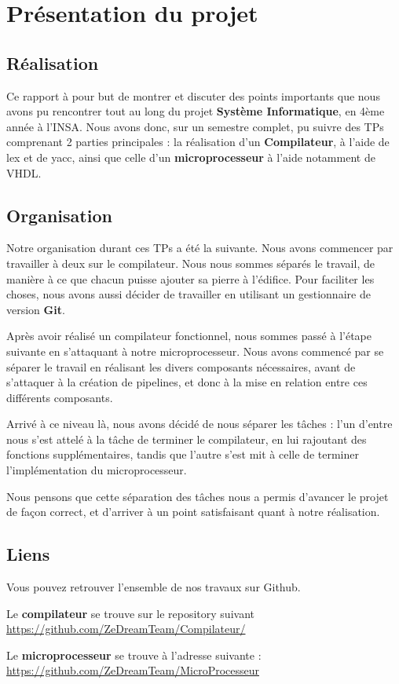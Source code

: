 \section{Présentation du projet}

    \subsection*{Réalisation}
    Ce rapport à pour but de montrer et discuter des points importants que nous avons pu rencontrer tout au long du projet \textbf{Système Informatique}, en 4ème année à l'INSA.  Nous avons donc, sur un semestre complet, pu suivre des TPs comprenant 2 parties principales : la réalisation d'un \textbf{Compilateur}, à l'aide de lex et de yacc, ainsi que celle d'un \textbf{microprocesseur} à l'aide notamment de VHDL.
    
    \subsection*{Organisation}
    Notre organisation durant ces TPs a été la suivante. Nous avons commencer par travailler à deux sur le compilateur. Nous nous sommes séparés le travail, de manière à ce que chacun puisse ajouter sa pierre à l'édifice. Pour faciliter les choses, nous avons aussi décider de travailler en utilisant un gestionnaire de version \textbf{Git}.
    
    Après avoir réalisé un compilateur fonctionnel, nous sommes passé à l'étape suivante en s'attaquant à notre microprocesseur. Nous avons commencé par se séparer le travail en réalisant les divers composants nécessaires, avant de s'attaquer à la création de pipelines, et donc à la mise en relation entre ces différents composants. 
    
    Arrivé à ce niveau là, nous avons décidé de nous séparer les tâches : l'un d'entre nous s'est attelé à la tâche de terminer le compilateur, en lui rajoutant des fonctions supplémentaires, tandis que l'autre s'est mit à celle de terminer l'implémentation du microprocesseur.
    
    Nous pensons que cette séparation des tâches nous a permis d'avancer le projet de façon correct, et d'arriver à un point satisfaisant quant à notre réalisation.
    
    \subsection*{Liens}
    Vous pouvez retrouver l'ensemble de nos travaux sur Github.
    
    Le \textbf{compilateur} se trouve sur le repository suivant \url{https://github.com/ZeDreamTeam/Compilateur/}
    
    Le \textbf{microprocesseur} se trouve à l'adresse suivante : \url{https://github.com/ZeDreamTeam/MicroProcesseur}